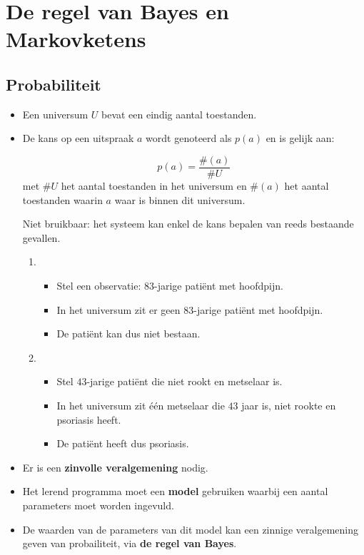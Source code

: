 \chapter{De regel van Bayes en Markovketens}


\section{Probabiliteit}
\begin{itemize}
	\item Een universum $U$ bevat een eindig aantal toestanden.
	\item De kans op een uitspraak $a$ wordt genoteerd als $p(a)$ en is gelijk aan:
	
	$$p(a) = \frac{\#(a)}{\#U} $$
	met $\#U$ het aantal toestanden in het universum en $\#(a)$ het aantal toestanden waarin $a$ waar is binnen dit universum.
	\begin{itemize}
		\alert Niet bruikbaar: het systeem kan enkel de kans bepalen van reeds bestaande gevallen. 
		\begin{enumerate}
			\item \begin{itemize}
				\item Stel een observatie: $83$-jarige patiënt met hoofdpijn.
				\item In het universum zit er geen $83$-jarige patiënt met hoofdpijn.
				\item De patiënt kan dus niet bestaan.
			\end{itemize}
			\item \begin{itemize}
				\item Stel $43$-jarige patiënt die niet rookt en metselaar is.
				\item In het universum zit één metselaar die $43$ jaar is, niet rookte en psoriasis heeft. 
				\item De patiënt heeft dus psoriasis.
			\end{itemize}
		\end{enumerate}
		
	\end{itemize}
	\item Er is een \textbf{zinvolle veralgemening} nodig.
	\item Het lerend programma moet een \textbf{model} gebruiken waarbij een aantal parameters moet worden ingevuld. 
	\item De waarden van de parameters van dit model kan een zinnige veralgemening geven van probailiteit, via \textbf{de regel van Bayes}.
		
\end{itemize}


